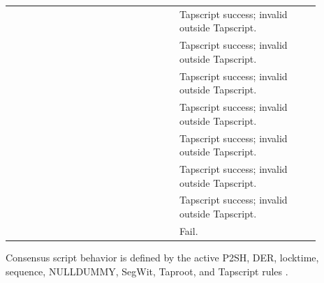 \begin{longtable}{@{}L{0.14\linewidth}L{0.34\linewidth}L{0.40\linewidth}@{}}
 &  & Tapscript success; invalid outside Tapscript. \\
 &  & Tapscript success; invalid outside Tapscript. \\
 &  & Tapscript success; invalid outside Tapscript. \\
 &  & Tapscript success; invalid outside Tapscript. \\
 &  & Tapscript success; invalid outside Tapscript. \\
 &  & Tapscript success; invalid outside Tapscript. \\
 &  & Tapscript success; invalid outside Tapscript. \\
 &  & Fail. \\
\bottomrule
\end{longtable}

Consensus script behavior is defined by the active P2SH, DER, locktime,
sequence, NULLDUMMY, SegWit, Taproot, and Tapscript rules
\cite{bip-0065,bip-0066,bip-0068,bip-0112,bip-0113,bip-0147,bip-0341,bip-0342,bitcoin-core-v31}.

